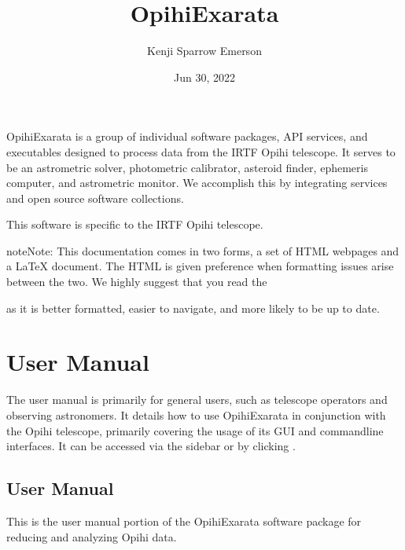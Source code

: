 \documentclass[letterpaper,11pt,english]{sphinxmanual}
\title{OpihiExarata}
\date{Jun 30, 2022}
\author{Kenji Sparrow Emerson}
\begin{document}
\pagestyle{empty}
\sphinxmaketitle
\pagestyle{plain}
\sphinxtableofcontents
\pagestyle{normal}
\label{\detokenize{index::doc}}


\sphinxAtStartPar
OpihiExarata is a group of individual software packages, API services, and
executables designed to process data from the IRTF Opihi telescope. It serves
to be an astrometric solver, photometric calibrator, asteroid finder,
ephemeris computer, and astrometric monitor. We accomplish this by integrating
services and open source software collections.

\sphinxAtStartPar
This software is specific to the IRTF Opihi telescope.

\begin{sphinxadmonition}{note}{Note:}
\sphinxAtStartPar
This documentation comes in two forms, a set of HTML webpages and a LaTeX
document. The HTML is given preference when formatting issues arise between
the two. We highly suggest that you read the
%
\begin{footnote}[1]\sphinxAtStartFootnote
{}
%
\end{footnote} as it is
better formatted, easier to navigate, and more likely to be up to date.
\end{sphinxadmonition}


\chapter{User Manual}
\label{\detokenize{index:user-manual}}\label{\detokenize{index:home-user-manual}}
\sphinxAtStartPar
The user manual is primarily for general users, such as telescope operators and
observing astronomers. It details how to use OpihiExarata in conjunction with
the Opihi telescope, primarily covering the usage of its GUI and command\sphinxhyphen{}line
interfaces. It can be accessed via the sidebar or by clicking
{\hyperref[\detokenize{user/index::doc}]{}}.

\sphinxstepscope


\section{User Manual}
\label{\detokenize{user/index:user-manual}}\label{\detokenize{user/index:user-index}}\label{\detokenize{user/index::doc}}
\sphinxAtStartPar
This is the user manual portion of the OpihiExarata software package for
reducing and analyzing Opihi data.
\end{document}
